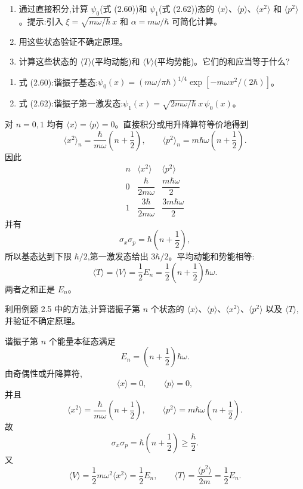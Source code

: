 \begin{question}
\begin{enumerate}
\item 通过直接积分,计算 $\psi_0$(式 (2.60))和 $\psi_1$(式 (2.62))态的 $\langle x\rangle$、$\langle p\rangle$、$\langle x^2\rangle$ 和 $\langle p^2\rangle$。提示:引入 $\xi=\sqrt{m\omega/\hbar}\,x$ 和 $\alpha=m\omega/\hbar$ 可简化计算。
\item 用这些状态验证不确定原理。
\item 计算这些状态的 $\langle T\rangle$(平均动能)和 $\langle V\rangle$(平均势能)。它们的和应当等于什么?
\end{enumerate}

\par\smallskip
{}
\begin{enumerate}[leftmargin=2.2em,itemsep=0.12em,topsep=0.12em,parsep=0pt]
\item 式 (2.60):谐振子基态:$\psi_0(x)=(m\omega/\pi\hbar)^{1/4}\exp[-m\omega x^2/(2\hbar)]$。
\item 式 (2.62):谐振子第一激发态:$\psi_1(x)=\sqrt{2m\omega/\hbar}\,x\,\psi_0(x)$。
\end{enumerate}

\begin{solution}
对 $n=0,1$ 均有 $\langle x\rangle=\langle p\rangle=0$。直接积分或用升降算符等价地得到
\[
\langle x^2\rangle_n=\frac{\hbar}{m\omega}\left(n+\frac12\right),
\qquad
\langle p^2\rangle_n=m\hbar\omega\left(n+\frac12\right).
\]
因此
\[
\begin{array}{c|cc}
 n&\langle x^2\rangle&\langle p^2\rangle\\ \hline
0&\dfrac{\hbar}{2m\omega}&\dfrac{m\hbar\omega}{2}\\[0.4em]
1&\dfrac{3\hbar}{2m\omega}&\dfrac{3m\hbar\omega}{2}
\end{array}
\]
并有
\[
\sigma_x\sigma_p=\hbar\left(n+\frac12\right),
\]
所以基态达到下限 $\hbar/2$,第一激发态给出 $3\hbar/2$。平均动能和势能相等:
\[
\langle T\rangle=\langle V\rangle=\frac12 E_n
=\frac12\left(n+\frac12\right)\hbar\omega.
\]
两者之和正是 $E_n$。
\end{solution}
\end{question}

\begin{question}
利用例题 2.5 中的方法,计算谐振子第 $n$ 个状态的 $\langle x\rangle$、$\langle p\rangle$、$\langle x^2\rangle$、$\langle p^2\rangle$ 以及 $\langle T\rangle$,并验证不确定原理。
\begin{solution}
谐振子第 $n$ 个能量本征态满足
\[
E_n=\left(n+\frac12\right)\hbar\omega.
\]
由奇偶性或升降算符,
\[
\langle x\rangle=0,
\qquad
\langle p\rangle=0,
\]
并且
\[
\langle x^2\rangle=\frac{\hbar}{m\omega}\left(n+\frac12\right),
\qquad
\langle p^2\rangle=m\hbar\omega\left(n+\frac12\right).
\]
故
\[
\sigma_x\sigma_p=\hbar\left(n+\frac12\right)\ge\frac\hbar2.
\]
又
\[
\langle V\rangle=\frac12m\omega^2\langle x^2\rangle=\frac12E_n,
\qquad
\langle T\rangle=\frac{\langle p^2\rangle}{2m}=\frac12E_n.
\]
\end{solution}
\end{question}


